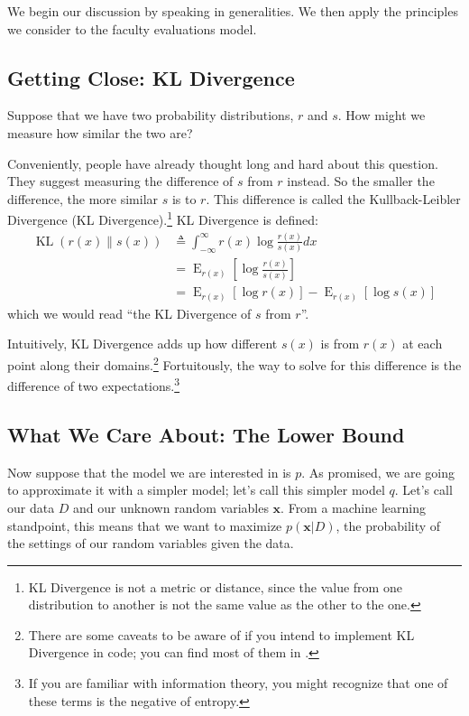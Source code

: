 \documentclass[12pt]{article}
\newcommand{\KL}{\operatorname{KL}}
\newcommand{\E}{\operatorname{E}}
\begin{document}
We begin our discussion by speaking in generalities.  We then apply the
principles we consider to the faculty evaluations model.

\subsection{Getting Close:  KL Divergence}

Suppose that we have two probability distributions, $r$ and $s$.  How might we
measure how similar the two are?

Conveniently, people have already thought long and hard about this question.
They suggest measuring the difference of $s$ from $r$ instead.  So the smaller
the difference, the more similar $s$ is to $r$.  This difference is called the
Kullback-Leibler Divergence (KL Divergence).\footnote{KL Divergence is not a
metric or distance, since the value from one distribution to another is not the
same value as the other to the one.} KL Divergence is defined:
\begin{align}\label{eq:kldivergence}
    \KL(r(x)\parallel s(x)) &\triangleq \int_{-\infty}^{\infty} r(x)
    \log{\frac{r(x)}{s(x)}}dx
    \nonumber \\
    &= \E_{r(x)}[\log \frac{r(x)}{s(x)}]
    \nonumber \\
    &= \E_{r(x)}[\log r(x)] - \E_{r(x)}[\log s(x)]
\end{align}
which we would read \enquote{the KL Divergence of $s$ from $r$}.

Intuitively, KL Divergence adds up how different $s(x)$ is from $r(x)$ at each
point along their domains.\footnote{There are some caveats to be aware of if you
intend to implement KL Divergence in code; you can find most of them in
\autocite{wikikl}.}  Fortuitously, the way to solve for this difference is the
difference of two expectations.\footnote{If you are familiar with information
theory, you might recognize that one of these terms is the negative of entropy.}

\subsection{What We Care About:  The Lower Bound}

Now suppose that the model we are interested in is $p$.  As promised, we are
going to approximate it with a simpler model; let's call this simpler model $q$.
Let's call our data $D$ and our unknown random variables $\bm{x}$.  From a
machine learning standpoint, this means that we want to maximize $p(\bm{x}|D)$,
the probability of the settings of our random variables given the data.
\end{document}

